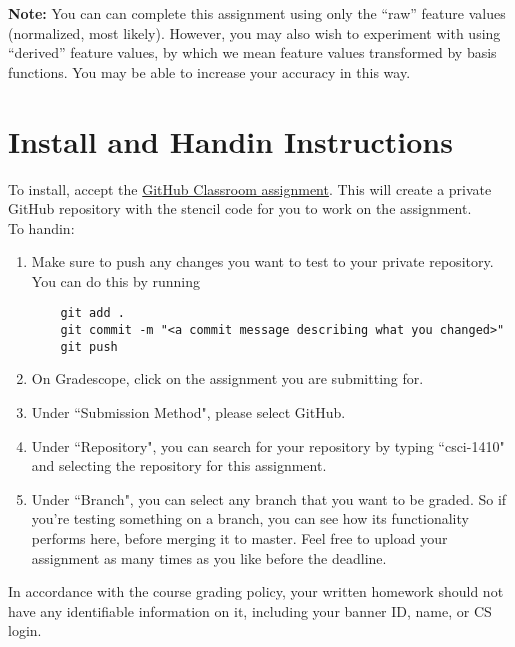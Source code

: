 \documentclass{article}
\begin{document}
\textbf{Note:}
You can can complete this assignment using only the ``raw'' feature values (normalized, most likely).
However, you may also wish to experiment with using ``derived'' feature values,
by which we mean feature values transformed by basis functions.
You may be able to increase your accuracy in this way.


\section{Install and Handin Instructions}
To install, accept the \href{https://classroom.github.com/a/ljI-UwCV}{GitHub Classroom assignment}. This will create a private GitHub repository with the stencil code for you to work on the
assignment. \\

To handin:
\begin{enumerate}
  \item Make sure to push any changes you want to test to your private
    repository. You can do this by running
    \begin{verbatim}
    git add .
    git commit -m "<a commit message describing what you changed>"
    git push
    \end{verbatim}

  \item On Gradescope, click on the assignment you are submitting for.

  \item Under ``Submission Method", please select GitHub.

  \item Under ``Repository", you can search for your repository by typing ``csci-1410"
    and selecting the repository for this assignment.

  \item Under ``Branch", you can select any branch that you want to be graded. So if
    you're testing something on a branch, you can see how its functionality
    performs here, before merging it to master. Feel free to upload your assignment
    as many times as you like before the deadline.
\end{enumerate}

In accordance with the course grading policy, your written homework should not have any identifiable information on it, including your banner ID, name, or CS login.
\end{document}
